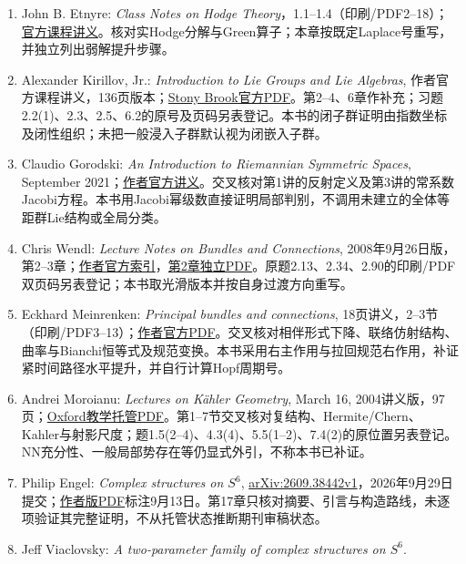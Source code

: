 \begin{enumerate}
\item John B. Etnyre: \textit{Class Notes on Hodge Theory}，1.1--1.4（印刷/PDF2--18）；\href{https://etnyre.math.gatech.edu/class/8803Fall18/Hodge.pdf}{官方课程讲义}。核对实Hodge分解与Green算子；本章按既定Laplace号重写，并独立列出弱解提升步骤。
\item Alexander Kirillov, Jr.: \textit{Introduction to Lie Groups and Lie Algebras}, 作者官方课程讲义，136页版本；\href{https://www.math.stonybrook.edu/~kirillov/mat552/liegroups.pdf}{Stony Brook官方PDF}。第2--4、6章作补充；习题2.2(1)、2.3、2.5、6.2的原号及页码另表登记。本书的闭子群证明由指数坐标及闭性组织；未把一般浸入子群默认视为闭嵌入子群。
\item Claudio Gorodski: \textit{An Introduction to Riemannian Symmetric Spaces}, September 2021；\href{https://users.ime.usp.br/~gorodski/ps/symmetric-spaces.pdf}{作者官方讲义}。交叉核对第1讲的反射定义及第3讲的常系数Jacobi方程。本书用Jacobi幂级数直接证明局部判别，不调用未建立的全体等距群Lie结构或全局分类。
\item Chris Wendl: \textit{Lecture Notes on Bundles and Connections}, 2008年9月26日版，第2--3章；\href{https://www.mathematik.hu-berlin.de/~wendl/connections.html}{作者官方索引}，\href{https://www.mathematik.hu-berlin.de/~wendl/pub/connections_chapter2.pdf}{第2章独立PDF}。原题2.13、2.34、2.90的印刷/PDF双页码另表登记；本书取光滑版本并按自身过渡方向重写。
\item Eckhard Meinrenken: \textit{Principal bundles and connections}, 18页讲义，2--3节（印刷/PDF3--13）；\href{https://www.math.toronto.edu/mein/teaching/moduli.pdf}{作者官方PDF}。交叉核对相伴形式下降、联络仿射结构、曲率与Bianchi恒等式及规范变换。本书采用右主作用与拉回规范右作用，补证紧时间路径水平提升，并自行计算Hopf周期号。
\item Andrei Moroianu: \textit{Lectures on K\"ahler Geometry}, March 16, 2004讲义版，97页；\href{https://people.maths.ox.ac.uk/joyce/Nairobi2019/MoroianuKahlerGeometry.pdf}{Oxford教学托管PDF}。第1--7节交叉核对复结构、Hermite/Chern、Kahler与射影尺度；题1.5(2--4)、4.3(4)、5.5(1--2)、7.4(2)的原位置另表登记。NN充分性、一般局部势存在等仍显式外引，不称本书已补证。
\item Philip Engel: \textit{Complex structures on $S^6$}, \href{https://arxiv.org/abs/2609.38442v1}{arXiv:2609.38442v1}，2026年9月29日提交；\href{https://philip-engel.github.io/S6.pdf}{作者版PDF}标注9月13日。第17章只核对摘要、引言与构造路线，未逐项验证其完整证明，不从托管状态推断期刊审稿状态。
\item Jeff Viaclovsky: \textit{A two-parameter family of complex structures on $S^6$}.\par

\end{enumerate}
